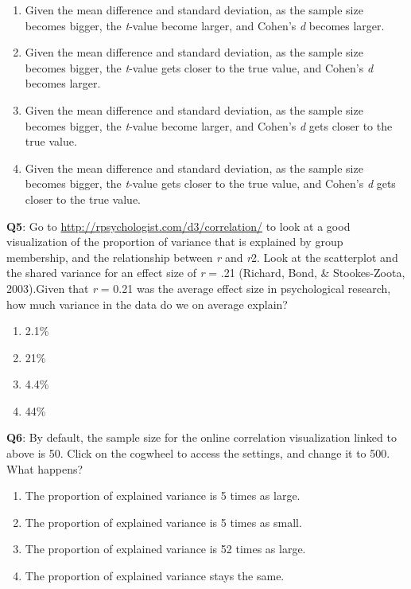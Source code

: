 \documentclass[
]{krantz}
\providecommand{\tightlist}{%
  \setlength{\itemsep}{0pt}\setlength{\parskip}{0pt}}
\begin{document}
\begin{enumerate}
\def\labelenumi{\Alph{enumi})}
\tightlist
\item
  Given the mean difference and standard deviation, as the sample size becomes bigger, the \emph{t}-value become larger, and Cohen's \emph{d} becomes larger.
\item
  Given the mean difference and standard deviation, as the sample size becomes bigger, the \emph{t}-value gets closer to the true value, and Cohen's \emph{d} becomes larger.
\item
  Given the mean difference and standard deviation, as the sample size becomes bigger, the \emph{t}-value become larger, and Cohen's \emph{d} gets closer to the true value.
\item
  Given the mean difference and standard deviation, as the sample size becomes bigger, the \emph{t}-value gets closer to the true value, and Cohen's \emph{d} gets closer to the true value.
\end{enumerate}

\textbf{Q5}: Go to \url{http://rpsychologist.com/d3/correlation/} to look at a good visualization of the proportion of variance that is explained by group membership, and the relationship between \emph{r} and \emph{r}2. Look at the scatterplot and the shared variance for an effect size of \emph{r} = .21 (Richard, Bond, \& Stookes-Zoota, 2003).Given that \emph{r} = 0.21 was the average effect size in psychological research, how much variance in the data do we on average explain?

\begin{enumerate}
\def\labelenumi{\Alph{enumi})}
\tightlist
\item
  2.1\%
\item
  21\%
\item
  4.4\%
\item
  44\%
\end{enumerate}

\textbf{Q6}: By default, the sample size for the online correlation visualization linked to above is 50. Click on the cogwheel to access the settings, and change it to 500. What happens?

\begin{enumerate}
\def\labelenumi{\Alph{enumi})}
\tightlist
\item
  The proportion of explained variance is 5 times as large.
\item
  The proportion of explained variance is 5 times as small.
\item
  The proportion of explained variance is 52 times as large.
\item
  The proportion of explained variance stays the same.
\end{enumerate}
\end{document}

